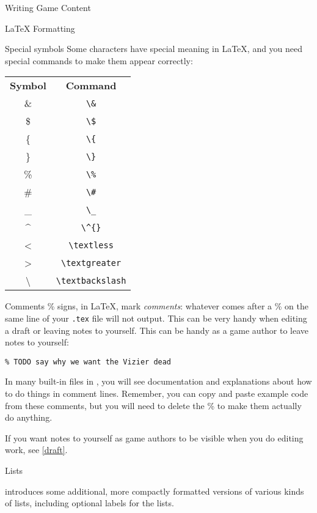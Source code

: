 \documentclass[sheet]{GameTexBase}
\begin{document}
\begin{section}{Writing Game Content}
\begin{subsection}{\LaTeX{} Formatting}
\begin{subsubsection}{Special symbols}
Some characters have special meaning in \LaTeX{}, and you need special commands to make them appear correctly:

\begin{center}
\begin{tabular}{c c}
 \textbf{Symbol} & \textbf{Command} \\
 \& & \lstinline|\&| \\
 \$ & \lstinline|\$| \\
 \{ & \lstinline|\{| \\
 \} & \lstinline|\}| \\
 \% & \lstinline|\%| \\
 \# & \lstinline|\#| \\
 \_ & \lstinline|\_| \\
 \^{} & \lstinline|\^{}| \\
 \textless & \lstinline|\textless| \\
 \textgreater & \lstinline|\textgreater| \\
 \textbackslash & \lstinline|\textbackslash|
\end{tabular}
\end{center}
\end{subsubsection}
\begin{subsubsection}{Comments}
\% signs, in \LaTeX{}, mark \textit{comments}: whatever comes after a \% on the same line of your \texttt{.tex} file will not output.  This can be very handy when editing a draft or leaving notes to yourself.
This can be handy as a game author to leave notes to yourself:
\begin{verbatim}
% TODO say why we want the Vizier dead
\end{verbatim}
In many built-in files in \gametex{}, you will see documentation and explanations about how to do things in comment lines.  Remember, you can copy and paste example code from these comments, but you will need to delete the \% to make them actually do anything.

If you want notes to yourself as game authors to be visible when you do editing work, see \ref{draft}.
\end{subsubsection}

\begin{subsubsection}{\gametex{} Lists}

\gametex{} introduces some additional, more compactly formatted versions of various kinds of lists, including optional labels for the lists.


\end{subsubsection}
\end{subsection}
\end{section}
\end{document}
